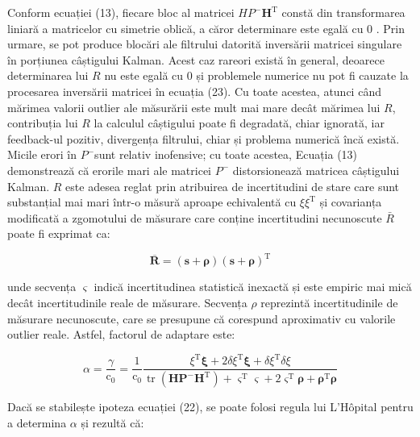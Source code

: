 \documentclass[10pt]{report}
\begin{document}
Conform ecuației (13), fiecare bloc al matricei $H P^{-} \boldsymbol{H}^{\mathrm{T}}$ constă din transformarea liniară a matricelor cu simetrie oblică, a căror determinare este egală cu 0 . Prin urmare, se pot produce blocări ale filtrului datorită inversării matricei singulare în porțiunea câștigului Kalman. Acest caz rareori există în general, deoarece determinarea lui $R$ nu este egală cu 0 și problemele numerice nu pot fi cauzate la procesarea inversării matricei în ecuația (23). Cu toate acestea, atunci când mărimea valorii outlier ale măsurării este mult mai mare decât mărimea lui $R$, contribuția lui $R$ la calculul câștigului poate fi degradată, chiar ignorată, iar feedback-ul pozitiv, divergența filtrului, chiar și problema numerică încă există. Micile erori în $P^{-}$sunt relativ inofensive; cu toate acestea, Ecuația (13) demonstrează că erorile mari ale matricei $P^{-}$ distorsionează matricea câștigului Kalman. $R$ este adesea reglat prin atribuirea de incertitudini de stare care sunt substanțial mai mari într-o măsură aproape echivalentă cu $\xi \xi^{\mathrm{T}}$ și covarianța modificată a zgomotului de măsurare care conține incertitudini necunoscute $\bar{R}$ poate fi exprimat ca:

\begin{equation}
  \overline{\boldsymbol{R}}=(\boldsymbol{s}+\boldsymbol{\rho})(\boldsymbol{s}+\boldsymbol{\rho})^{\mathrm{T}}
\end{equation}

unde secvența $\varsigma$ indică incertitudinea statistică inexactă și este empiric mai mică decât incertitudinile reale de măsurare. Secvența $\rho$ reprezintă incertitudinile de măsurare necunoscute, care se presupune că corespund aproximativ cu valorile outlier reale. Astfel, factorul de adaptare este:

\begin{equation}
  \alpha=\frac{\gamma}{\mathrm{c}_{0}}=\frac{1}{\mathrm{c}_{0}} \frac{\xi^{\mathrm{T}} \boldsymbol{\xi}+2 \delta \xi^{\mathrm{T}} \boldsymbol{\xi}+\delta \xi^{\mathrm{T}} \delta \xi}{\operatorname{tr}\left(\boldsymbol{H} \boldsymbol{P}^{-} \boldsymbol{H}^{\mathrm{T}}\right)+\boldsymbol{\varsigma}^{\mathrm{T}} \boldsymbol{\varsigma}+2 \boldsymbol{\varsigma}^{\mathrm{T}} \boldsymbol{\rho}+\boldsymbol{\rho}^{\mathrm{T}} \boldsymbol{\rho}}
\end{equation}


Dacă se stabilește ipoteza ecuației (22), se poate folosi regula lui L'Hôpital pentru a determina $\alpha$ și rezultă că:
\end{document}
